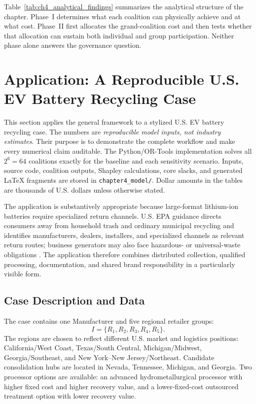 Table~\ref{tab:ch4_analytical_findings} summarizes the analytical structure of the chapter. Phase~I determines what each coalition can physically achieve and at what cost. Phase~II first allocates the grand-coalition cost and then tests whether that allocation can sustain both individual and group participation. Neither phase alone answers the governance question.

\section{Application: A Reproducible U.S. EV Battery Recycling Case}
\label{sec:case_study}


This section applies the general framework to a stylized U.S. EV battery recycling case. The numbers are \emph{reproducible model inputs, not industry estimates}. Their purpose is to demonstrate the complete workflow and make every numerical claim auditable. The Python/OR-Tools implementation solves all $2^6=64$ coalitions exactly for the baseline and each sensitivity scenario. Inputs, source code, coalition outputs, Shapley calculations, core slacks, and generated LaTeX fragments are stored in \texttt{chapter4\_model/}. Dollar amounts in the tables are thousands of U.S. dollars unless otherwise stated.

The application is substantively appropriate because large-format lithium-ion batteries require specialized return channels. U.S. EPA guidance directs consumers away from household trash and ordinary municipal recycling and identifies manufacturers, dealers, installers, and specialized channels as relevant return routes; business generators may also face hazardous- or universal-waste obligations \cite{EPA2026UsedLithiumIon,EPA2026UniversalWaste}. The application therefore combines distributed collection, qualified processing, documentation, and shared brand responsibility in a particularly visible form.

\subsection{Case Description and Data}

The case contains one Manufacturer and five regional retailer groups:
\begin{equation*}
I=\{R_1,R_2,R_3,R_4,R_5\}.
\end{equation*}
The regions are chosen to reflect different U.S. market and logistics positions: California/West Coast, Texas/South Central, Michigan/Midwest, Georgia/Southeast, and New York--New Jersey/Northeast. Candidate consolidation hubs are located in Nevada, Tennessee, Michigan, and Georgia. Two processor options are available: an advanced hydrometallurgical processor with higher fixed cost and higher recovery value, and a lower-fixed-cost outsourced treatment option with lower recovery value.

